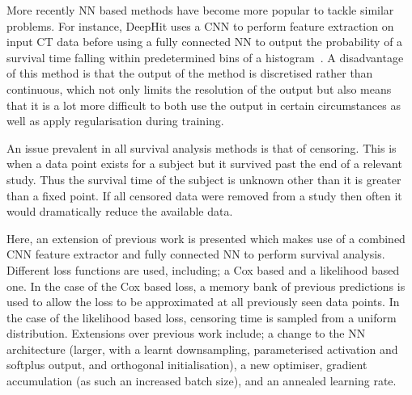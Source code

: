     More recently \gls{NN} based methods have become more popular to tackle similar problems. For instance, DeepHit uses a \gls{CNN} to perform feature extraction on input \gls{CT} data before using a fully connected \gls{NN} to output the probability of a survival time falling within predetermined bins of a histogram~\cite{Lee2018DeepHit:Risks}. A disadvantage of this method is that the output of the method is discretised rather than continuous, which not only limits the resolution of the output but also means that it is a lot more difficult to both use the output in certain circumstances as well as apply regularisation during training.

    An issue prevalent in all survival analysis methods is that of censoring. This is when a data point exists for a subject but it survived past the end of a relevant study. Thus the survival time of the subject is unknown other than it is greater than a fixed point. If all censored data were removed from a study then often it would dramatically reduce the available data.

    Here, an extension of previous work is presented which makes use of a combined \gls{CNN} feature extractor and fully connected \gls{NN} to perform survival analysis. Different loss functions are used, including; a Cox based and a likelihood based one. In the case of the Cox based loss, a memory bank of previous predictions is used to allow the loss to be approximated at all previously seen data points. In the case of the likelihood based loss, censoring time is sampled from a uniform distribution. Extensions over previous work include; a change to the \gls{NN} architecture (larger, with a learnt downsampling, parameterised activation and softplus output, and orthogonal initialisation), a new optimiser, gradient accumulation (as such an increased batch size), and an annealed learning rate.
